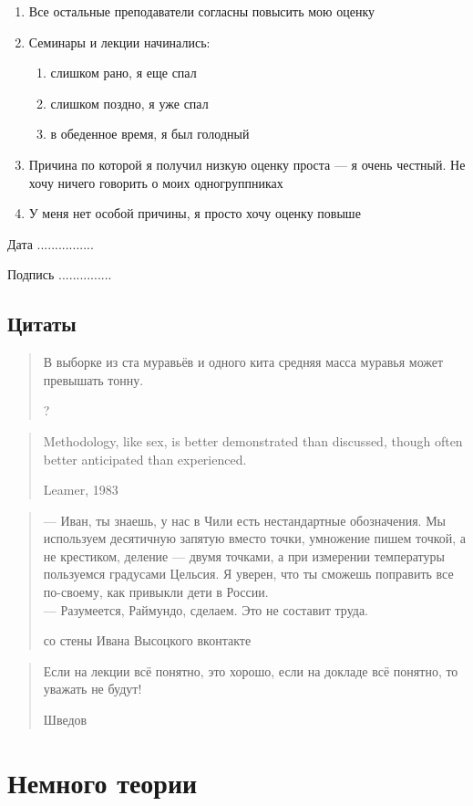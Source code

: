 \documentclass[12pt, a4paper]{article}
\theoremstyle{definition}
\begin{document}
\begin{enumerate}
\item Все остальные преподаватели согласны повысить мою оценку
\item Семинары и лекции начинались:
\begin{enumerate}
\item слишком рано, я еще спал
\item слишком поздно, я уже спал
\item в обеденное время, я был голодный
\end{enumerate}
\item Причина по которой я получил низкую оценку проста — я очень честный. Не хочу ничего говорить о моих одногруппниках
\item У меня нет особой причины, я просто хочу оценку повыше
\end{enumerate}


\vspace{10pt}
Дата ................

\vspace{10pt}
Подпись ...............

\subsection{Цитаты}

\blockquote[?]{В выборке из ста муравьёв и одного кита средняя масса муравья может превышать тонну.}

\blockquote[Leamer, 1983]{Methodology, like sex, is better demonstrated than discussed, though often better anticipated than experienced.}



\blockquote[со стены Ивана Высоцкого вконтакте]{
— Иван, ты знаешь, у нас в Чили есть нестандартные обозначения. Мы используем десятичную запятую вместо точки, умножение пишем точкой, а не крестиком, деление — двумя точками, а при измерении температуры пользуемся градусами Цельсия. Я уверен, что ты сможешь поправить все по-своему, как привыкли дети в России. \\

— Разумеется, Раймундо, сделаем. Это не составит труда.}


\blockquote[Шведов]{Если на лекции всё понятно, это хорошо, если на докладе всё понятно, то уважать не будут!}


\section{Немного теории}
\end{document}
